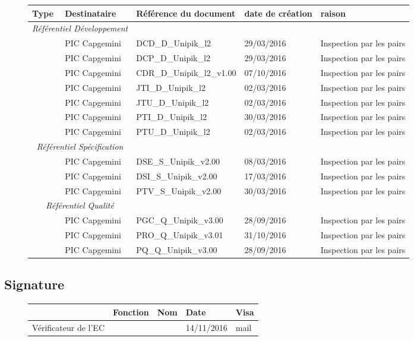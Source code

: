 \documentclass[asi, sansVersion]{picInsa}
\begin{document}
\begin{figure}[H]
		\centering
		\begin{tabularx}{17cm}{|X|X|p{5cm}|p{2cm}|X|}
		\hline
		\rowcolor[gray]{0.85}Type & Destinataire & Référence du document & date de création & raison\\
		\hline
		\multicolumn{2}{|c|}{\textit{Référentiel Développement}}\\
		\hline 
		\DCD & PIC Capgemini & DCD\_D\_Unipik\_l2 & 29/03/2016 & Inspection par les pairs \\
		\DCP & PIC Capgemini & DCP\_D\_Unipik\_l2 & 29/03/2016 & Inspection par les pairs \\	
		\CDR & PIC Capgemini & CDR\_D\_Unipik\_l2\_v1.00 & 07/10/2016 & Inspection par les pairs \\
		\JTI & PIC Capgemini & JTI\_D\_Unipik\_l2 & 02/03/2016 & Inspection par les pairs \\
		\JTU & PIC Capgemini & JTU\_D\_Unipik\_l2 & 02/03/2016 & Inspection par les pairs \\
		\PTI & PIC Capgemini & PTI\_D\_Unipik\_l2 & 30/03/2016 & Inspection par les pairs \\
		\PTU & PIC Capgemini & PTU\_D\_Unipik\_l2 & 02/03/2016 & Inspection par les pairs \\
		\hline 
		\multicolumn{2}{|c|}{\textit{Référentiel Spécification}}\\
		\hline
		\DSE & PIC Capgemini & DSE\_S\_Unipik\_v2.00 & 08/03/2016 & Inspection par les pairs \\
		\DSI & PIC Capgemini & DSI\_S\_Unipik\_v2.00 & 17/03/2016 & Inspection par les pairs \\
		\PTV & PIC Capgemini & PTV\_S\_Unipik\_v2.00 & 30/03/2016 & Inspection par les pairs \\	
		\hline 
		\multicolumn{2}{|c|}{\textit{Référentiel Qualité}}\\
		\hline
		\PGC & PIC Capgemini & PGC\_Q\_Unipik\_v3.00 & 28/09/2016 & Inspection par les pairs \\ 
		\PRO & PIC Capgemini & PRO\_Q\_Unipik\_v3.01 & 31/10/2016 & Inspection par les pairs \\
		\PQ & PIC Capgemini & PQ\_Q\_Unipik\_v3.00 & 28/09/2016 & Inspection par les pairs \\
		\hline 
		\end{tabularx}
\end{figure}

\subsection*{Signature}

\begin{figure}[H]
		\centering
		\begin{tabularx}{17cm}{|p{4cm}|X|X|X|X|}
		\hline
		\rowcolor[gray]{0.85}& Fonction & Nom & Date & Visa \\
		\hline
		 Vérificateur de l'EC & \CP & \Pierre & 14/11/2016 & mail \\
		\hline
		\end{tabularx}
\end{figure}
\end{document}

